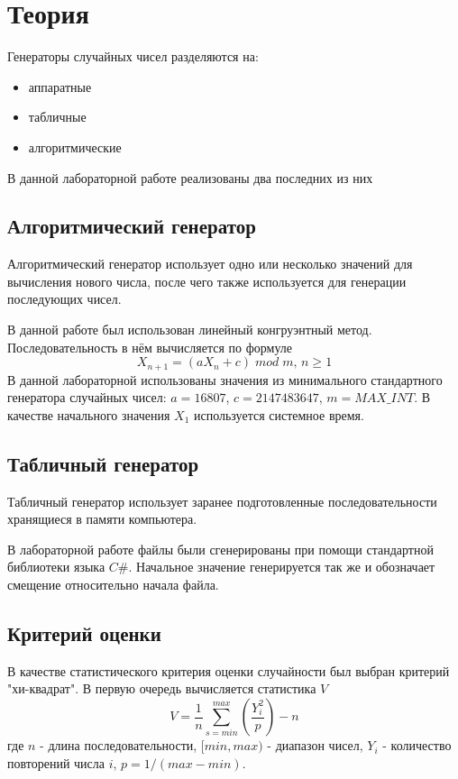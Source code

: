 \section{Теория}
	Генераторы случайных чисел разделяются на:
	\begin{itemize}
		\item аппаратные
		\item табличные
		\item алгоритмические
	\end{itemize}
	В данной лабораторной работе реализованы два последних из них
	
	\subsection{Алгоритмический генератор}
	Алгоритмический генератор использует одно или несколько значений для вычисления нового числа, после чего также используется для генерации последующих чисел.  
	
	В данной работе был использован линейный конгруэнтный метод. Последовательность в нём вычисляется по формуле
	\begin{equation}
		X_{n+1} = (aX_n + c)\;mod\;m,\,n \ge 1
	\end{equation}
	В данной лабораторной использованы значения из минимального стандартного генератора случайных чисел: $a = 16807$, $c = 2147483647$, $m = {MAX\_INT}$. 
	В качестве начального значения $X_1$ используется системное время.
	
	\subsection{Табличный генератор}
	Табличный генератор использует заранее подготовленные последовательности хранящиеся в памяти компьютера. 
	
	В лабораторной работе файлы были сгенерированы при помощи стандартной библиотеки языка $C\#$. Начальное значение генерируется так же и обозначает смещение относительно начала файла.
	
	\subsection{Критерий оценки}
	В качестве статистического критерия оценки случайности был выбран критерий "хи-квадрат". В первую очередь вычисляется статистика $V$
	\begin{equation}
		V = \frac{1}{n} \sum^{max}_{s=min}(\dfrac{Y^2_i}{p}) - n
	\end{equation}
	где $n$ - длина последовательности, $[min, max)$ - диапазон чисел, $Y_i$ - количество повторений числа $i$, $p=1/(max-min)$.
	
